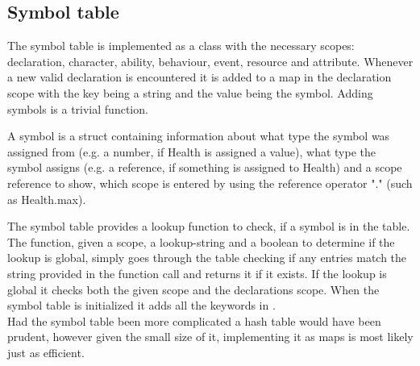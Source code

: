 \subsection{Symbol table}
The symbol table is implemented as a class with the necessary scopes: declaration, character, ability, behaviour, event, resource and attribute. Whenever a new valid declaration is encountered it is added to a map in the declaration scope with the key being a string and the value being the symbol. Adding symbols is a trivial function.

A symbol is a struct containing information about what type the symbol was assigned from (e.g. a number, if Health is assigned a value), what type the symbol assigns (e.g. a reference, if something is assigned to Health) and a scope reference to show, which scope is entered by using the reference operator "." (such as Health.max).

The symbol table provides a lookup function to check, if a symbol is in the table. The function, given a scope, a lookup-string and a boolean to determine if the lookup is global, simply goes through the table checking if any entries match the string provided in the function call and returns it if it exists. If the lookup is global it checks both the given scope and the declarations scope. When the symbol table is initialized it adds all the keywords in \langname{}.\\
Had the symbol table been more complicated a hash table would have been prudent, however given the small size of it, implementing it as maps is most likely just as efficient.